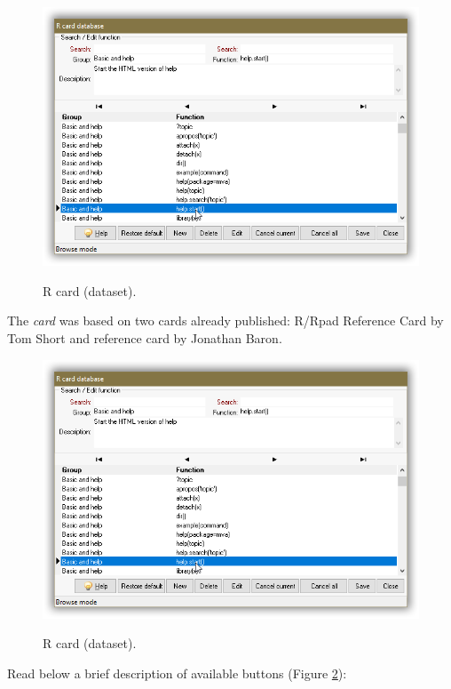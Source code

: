 \begin{figure}[H]
  \includegraphics[scale=0.35]{./res/dlg_r_card.png}\\
  \caption{R card (dataset).}
  \label{fig:dlg_r_card}
\end{figure}
The \textit{card} was based on two \RR{} cards already published:
R/Rpad Reference Card by Tom Short and \RR{} reference card by Jonathan Baron.

\begin{figure}[H]
  \includegraphics[scale=0.35]{./res/dlg_r_card.png}\\
  \caption{R card (dataset).}
  \label{fig:dlg_r_card}
\end{figure}

Read below a brief description of available buttons (Figure \ref{fig:dlg_r_card}):

